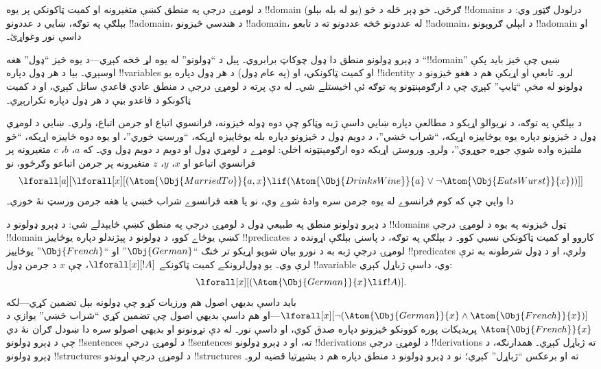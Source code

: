 \documentclass[../../../include/open-logic-section]{subfiles}
\begin{document}


د لومړۍ درجې په منطق کښې متغيرونه او کميت ټاکونکي پر يوه
!!{domain} ګرځي۔ خو ډېر ځله د څو (يو له بله بېلو) !!{domain}s درلودل
ګټور وي: د بېلګې په توګه، ښايي د عددونو !!a{domain}، د هندسي څيزونو
!!a{domain}، له عددونو څخه عددونو ته د تابعو !!a{domain}، د ابېلي
ګروپونو !!a{domain} او داسې نور وغواړئ۔

د ډېرو ډولونو منطق دا ډول چوکاټ برابروي۔ پيل د ``ډولونو'' له يوه لړ
څخه کېږي---د يوه څيز ``ډول'' هغه ``!!{domain}'' ښيي چې څيز بايد پکې
اوسېږي۔ بيا د هر ډول دپاره !!{variable}s او کميت ټاکونکي، او (په عام
ډول) د هر ډول دپاره يو !!{identity} لرو۔ تابعې او اړيکې هم د هغو
څيزونو د ډولونو له مخې ``ټايپ'' کېږي چې د ارګومېنټونو په توګه ئې
اخيستلے شي۔ له دې پرته د لومړۍ درجې د منطق عادي قاعدې ساتل کېږي، او
د کميت ټاکونکو د قاعدو بڼې د هر ډول دپاره تکرارېږي۔

د بېلګې په توګه، د نړيوالو اړيکو د مطالعې دپاره ښايي داسې ژبه وټاکو
چې دوه ډوله څيزونه، فرانسوي اتباع او جرمن اتباع، ولري۔ ښايي د لومړي
ډول د څيزونو دپاره يوه يوځاييزه اړيکه، ``شراب څښي''، د دويم ډول د
څيزونو دپاره بله يوځاييزه اړيکه، ``ورسټ خوري''، او يوه دوه ځاييزه
اړيکه، ``څو ملتيزه واده شوې جوړه جوړوي''، ولرو۔ وروستۍ اړيکه دوه
ارګومېنټونه اخلي: لومړے د لومړي ډول او دويم د دويم ډول وي۔ که $a$،
$b$، $c$ متغيرونه پر فرانسوي اتباعو او $x$، $y$، $z$ متغيرونه پر
جرمن اتباعو وګرځوو، نو
\[
\lforall[a][\lforall[x][(\Atom{\Obj{MarriedTo}}{a,x} \lif
(\Atom{\Obj{DrinksWine}}{a} \lor \lnot \Atom{\Obj{EatsWurst}}{x}))]]
\]
دا وايي چې که کوم فرانسوے له يوه جرمن سره وادۀ شوے وي، نو يا هغه
فرانسوے شراب څښي يا هغه جرمن ورسټ نۀ خوري۔

د ډېرو ډولونو منطق په طبيعي ډول د لومړۍ درجې په منطق کښې ځايېدلے شي:
د ډېرو ډولونو د !!{domain}s ټول څيزونه په يوه د لومړۍ درجې !!{domain}
کښې يوځاے کوو، د ډولونو د پېژندلو دپاره يوځاييز !!{predicate}s کاروو
او کميت ټاکونکي نسبي کوو۔ د بېلګې په توګه، د پاسنۍ بېلګې اړونده د
لومړۍ درجې ژبه به د نورو بيان شويو اړيکو تر څنګ ``$\Obj{German}$''
او ``$\Obj{French}$'' يوځاييز !!{predicate}s ولري، او د ډول شرطونه
به ترې لرې وي۔ يو ډول‌لرونکے کميت ټاکونکے $\lforall[x][!A]$، چې $x$
د جرمن ډول !!a{variable} وي، داسې ژباړل کېږي:
\[
\lforall[x][(\Atom{\Obj{German}}{x} \lif !A)].
\]
بايد داسې بديهي اصول هم ورزيات کړو چې ډولونه بېل تضمين کړي---لکه
$\lforall[x][\lnot (\Atom{\Obj{German}}{x} \land
  \Atom{\Obj{French}}{x})]$---او هم داسې بديهي اصول چې تضمين کړي
``شراب څښي'' يوازې د $\Atom{\Obj{French}}{x}$ پريديکات پوره کوونکو
څيزونو دپاره صدق کوي، او داسې نور۔ له دې تړونونو او بديهي اصولو سره
دا ښودل ګران نۀ دي چې د ډېرو ډولونو !!{sentence}s د لومړۍ درجې
!!{sentence}s ته، او د ډېرو ډولونو !!{derivation}s د لومړۍ درجې
!!{derivation}s ته ژباړل کېږي۔ همدارنګه، د ډېرو ډولونو !!{structure}s
د لومړۍ درجې اړوندو !!{structure}s ته او برعکس ``ژباړل'' کېږي؛ نو د
ډېرو ډولونو د منطق دپاره هم د بشپړتيا قضيه لرو۔
\end{document}
